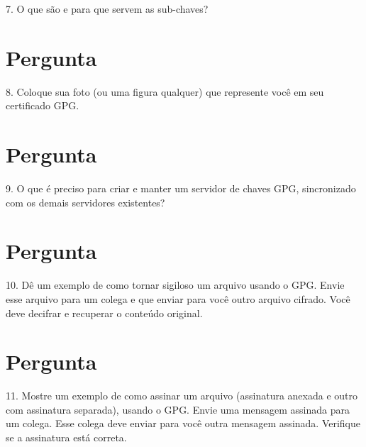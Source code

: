 \documentclass{article}
\begin{document}
    \begin{superframe}
        7. O que são e para que servem as sub-chaves?
    \end{superframe}

    \section{Pergunta}

    \begin{superframe}
        8. Coloque sua foto (ou uma figura qualquer) que represente você em seu
        certificado GPG\@.
    \end{superframe}

    \section{Pergunta}

    \begin{superframe}
        9. O que é preciso para criar e manter um servidor de chaves GPG,
        sincronizado com os demais servidores existentes?
    \end{superframe}

    \section{Pergunta}

    \begin{superframe}
        10. Dê um exemplo de como tornar sigiloso um arquivo usando o GPG\@.
        Envie esse arquivo para um colega e que enviar para você outro arquivo
        cifrado. Você deve decifrar e recuperar o conteúdo original.
    \end{superframe}

    \section{Pergunta}

    \begin{superframe}
        11. Mostre um exemplo de como assinar um arquivo (assinatura anexada e
        outro com assinatura separada), usando o GPG\@. Envie uma mensagem
        assinada para um colega. Esse colega deve enviar para você outra
        mensagem assinada. Verifique se a assinatura está correta.
    \end{superframe}
\end{document}
